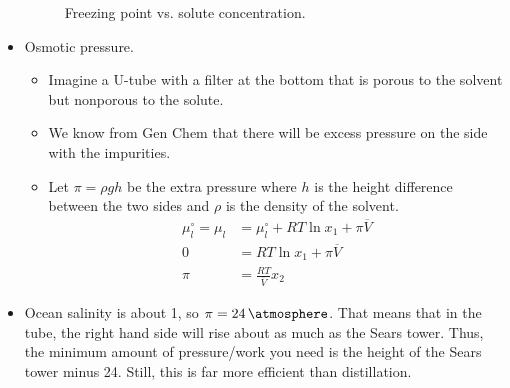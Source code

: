 \documentclass[../notes.tex]{subfiles}
\begin{document}
\begin{itemize}
\begin{figure}[h!]
        \caption{Freezing point vs. solute concentration.}
        \label{fig:H2OFP}
    \end{figure}
    \item Osmotic pressure.
    \begin{itemize}
        \item Imagine a U-tube with a filter at the bottom that is porous to the solvent but nonporous to the solute.
        \item We know from Gen Chem that there will be excess pressure on the side with the impurities.
        \item Let $\pi=\rho gh$ be the extra pressure where $h$ is the height difference between the two sides and $\rho$ is the density of the solvent.
        \begin{align*}
            \mu_l^\circ = \mu_l &= \mu_l^\circ+RT\ln x_1+\pi\overline{V}\\
            0 &= RT\ln x_1+\pi\overline{V}\\
            \pi &= \frac{RT}{\overline{V}}x_2
        \end{align*}
    \end{itemize}
    \item Ocean salinity is about \SI{1}{\molar}, so $\pi=\SI{24}{\atmosphere}$. That means that in the tube, the right hand side will rise about as much as the Sears tower. Thus, the minimum amount of pressure/work you need is the height of the Sears tower minus \SI{24}{\atmosphere}. Still, this is far more efficient than distillation.
\end{itemize}
\end{document}
